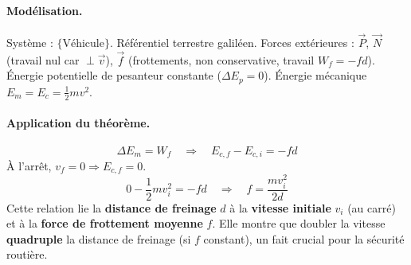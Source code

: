\documentclass[11pt]{article}
\begin{document}
\paragraph{Modélisation.}
Système : $\{ \text{Véhicule} \}$. Référentiel terrestre galiléen.
Forces extérieures : $\vec{P}$, $\vec{N}$ (travail nul car $\perp \vec{v}$), $\vec{f}$ (frottements, non conservative, travail $W_f = -f d$).
Énergie potentielle de pesanteur constante ($\Delta E_p = 0$).
Énergie mécanique $E_m = E_c = \frac{1}{2}mv^2$.

\paragraph{Application du théorème.}
\[
\Delta E_m = W_f \quad \Rightarrow \quad E_{c,f} - E_{c,i} = -f d
\]
À l'arrêt, $v_f = 0 \Rightarrow E_{c,f} = 0$.
\[
0 - \frac{1}{2}mv_i^2 = -f d \quad \Rightarrow \quad \boxed{f = \frac{m v_i^2}{2d}}
\]
Cette relation lie la \textbf{distance de freinage} $d$ à la \textbf{vitesse initiale} $v_i$ (au carré) et à la \textbf{force de frottement moyenne} $f$. Elle montre que doubler la vitesse \textbf{quadruple} la distance de freinage (si $f$ constant), un fait crucial pour la sécurité routière.
\end{document}

